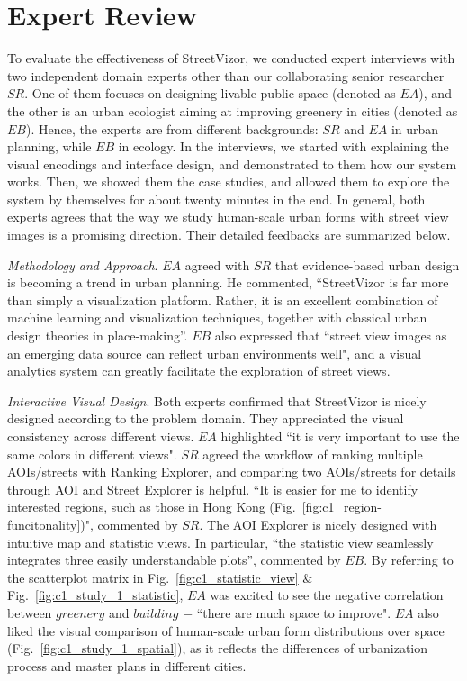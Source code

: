\section{Expert Review}

To evaluate the effectiveness of StreetVizor, we conducted expert interviews with two independent domain experts other than our collaborating senior researcher $SR$.
One of them focuses on designing livable public space (denoted as $EA$), and the other is an urban ecologist aiming at improving greenery in cities (denoted as $EB$).
Hence, the experts are from different backgrounds: $SR$ and $EA$ in urban planning, while $EB$ in ecology.
In the interviews, we started with explaining the visual encodings and interface design, and demonstrated to them how our system works.
Then, we showed them the case studies, and allowed them to explore the system by themselves for about twenty minutes in the end.
In general, both experts agrees that the way we study human-scale urban forms with street view images is a promising direction.
Their detailed feedbacks are summarized below.

\vspace*{2mm}
\noindent
\textit{Methodology and Approach}.
$EA$ agreed with $SR$ that evidence-based urban design is becoming a trend in urban planning.
He commented, ``StreetVizor is far more than simply a visualization platform. 
Rather, it is an excellent combination of machine learning and visualization techniques, together with classical urban design theories in place-making''.
$EB$ also expressed that ``street view images as an emerging data source can reflect urban environments well", and a visual analytics system can greatly facilitate the exploration of street views.

\vspace*{2mm}
\noindent
\textit{Interactive Visual Design}.
Both experts confirmed that StreetVizor is nicely designed according to the problem domain.
They appreciated the visual consistency across different views.
$EA$ highlighted ``it is very important to use the same colors in different views". 
$SR$ agreed the workflow of ranking multiple AOIs/streets with Ranking Explorer, and comparing two AOIs/streets for details through AOI and Street Explorer is helpful.
``It is easier for me to identify interested regions, such as those in Hong Kong (Fig.~\ref{fig:c1_region-funcitonality})", commented by $SR$.
The AOI Explorer is nicely designed with intuitive map and statistic views.
In particular, ``the statistic view seamlessly integrates three easily understandable plots'', commented by $EB$.
By referring to the scatterplot matrix in Fig.~\ref{fig:c1_statistic_view} \& Fig.~\ref{fig:c1_study_1_statistic}, $EA$ was excited to see the negative correlation between $greenery$ and $building$ $-$ ``there are much space to improve".
$EA$ also liked the visual comparison of human-scale urban form distributions over space (Fig.~\ref{fig:c1_study_1_spatial}), as it reflects the differences of urbanization process and master plans in different cities.

